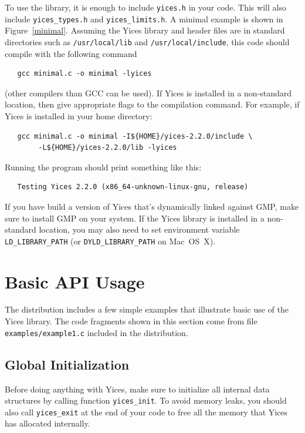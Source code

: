 \documentclass[11pt,twoside,fleqn,openright,titlepage]{cslreport}
\begin{document}
To use the library, it is enough to include \texttt{yices.h} in your
code. This will also include \texttt{yices\_types.h} and
\texttt{yices\_limits.h}. A minimal example is shown in
Figure~\ref{minimal}. Assuming the Yices library and header files are
in standard directories such as \texttt{/usr/local/lib} and
\texttt{/usr/local/include}, this code should compile with the
following command
\begin{small}
\begin{verbatim}
   gcc minimal.c -o minimal -lyices
\end{verbatim}
\end{small}
(other compilers than GCC can be used). If Yices is installed in a
non-standard location, then give appropriate flags to the compilation
command. For example, if Yices is installed in your home directory:
\begin{small}
\begin{verbatim}
   gcc minimal.c -o minimal -I${HOME}/yices-2.2.0/include \
        -L${HOME}/yices-2.2.0/lib -lyices
\end{verbatim}
\end{small}
Running the program should print something like this:
\begin{small}
\begin{verbatim}
   Testing Yices 2.2.0 (x86_64-unknown-linux-gnu, release)
\end{verbatim}
\end{small}
If you have build a version of Yices that's dynamically linked against
GMP, make sure to install GMP on your system.  If the Yices library is
installed in a non-standard location, you may also need to set
environment variable \texttt{LD\_LIBRARY\_PATH} (or
\texttt{DYLD\_LIBRARY\_PATH} on Mac~OS~X).


\section{Basic API Usage}

The distribution includes a few simple examples that illustrate basic
use of the Yices library. The code fragments shown in this section
come from file \texttt{examples/example1.c} included in the
distribution.

\subsection*{Global Initialization}

Before doing anything with Yices, make sure to initialize all internal
data structures by calling function \texttt{yices\_init}.  To avoid
memory leaks, you should also call \texttt{yices\_exit} at the end of
your code to free all the memory that Yices has allocated internally.
\end{document}
